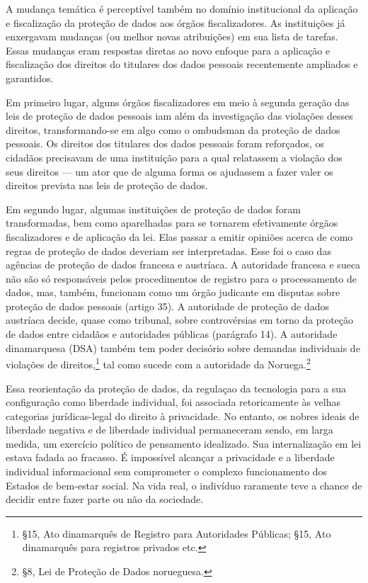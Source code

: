 A mudança temática é perceptível também no domínio institucional da
aplicação e fiscalização da proteção de dados aos órgãos fiscalizadores.
As instituições já enxergavam mudanças (ou melhor novas atribuições) em
sua lista de tarefas. Essas mudanças eram respostas diretas ao novo
enfoque para a aplicação e fiscalização dos direitos do titulares dos
dados pessoais recentemente ampliados e garantidos.

Em primeiro lugar, alguns órgãos fiscalizadores em meio à segunda
geração das leis de proteção de dados pessoais iam além da investigação
das violações desses direitos, transformando-se em algo como o ombudsman
da proteção de dados pessoais. Os direitos dos titulares dos dados
pessoais foram reforçados, os cidadãos precisavam de uma instituição
para a qual relatassem a violação dos seus direitos --- um ator que de
alguma forma os ajudassem a fazer valer os direitos prevista nas leis de
proteção de dados.

Em segundo lugar, algumas instituições de proteção de dados foram
transformadas, bem como aparelhadas para se tornarem efetivamente órgãos
fiscalizadores e de aplicação da lei. Elas passar a emitir opiniões
acerca de como regras de proteção de dados deveriam ser interpretadas.
Esse foi o caso das agências de proteção de dados francesa e austríaca.
A autoridade francesa e sueca não são só responsáveis pelos
procedimentos de registro para o processamento de dados, mas, também,
funcionam como um órgão judicante em disputas sobre proteção de dados
pessoais (artigo 35). A autoridade de proteção de dados austríaca
decide, quase como tribunal, sobre controvérsias em torno da proteção de
dados entre cidadãos e autoridades públicas (parágrafo 14). A autoridade
dinamarquesa (DSA) também tem poder decisório sobre demandas individuais
de violações de direitos,\footnote{§15, Ato dinamarquês de Registro para
  Autoridades Públicas; §15, Ato dinamarquês para registros privados
  etc.} tal como sucede com a autoridade da Noruega.\footnote{§8, Lei de
  Proteção de Dados norueguesa.}

Essa reorientação da proteção de dados, da regulaçao da tecnologia para
a sua configuração como liberdade individual, foi associada
retoricamente às velhas categorias jurídicas-legal do direito à
privacidade. No entanto, os nobres ideais de liberdade negativa e de
liberdade individual permaneceram sendo, em larga medida, um exercício
político de pensamento idealizado. Sua internalização em lei estava
fadada ao fracasso. É impossível alcançar a privacidade e a liberdade
individual informacional sem comprometer o complexo funcionamento dos
Estados de bem-estar social. Na vida real, o indivíduo raramente teve a
chance de decidir entre fazer parte ou não da sociedade.

